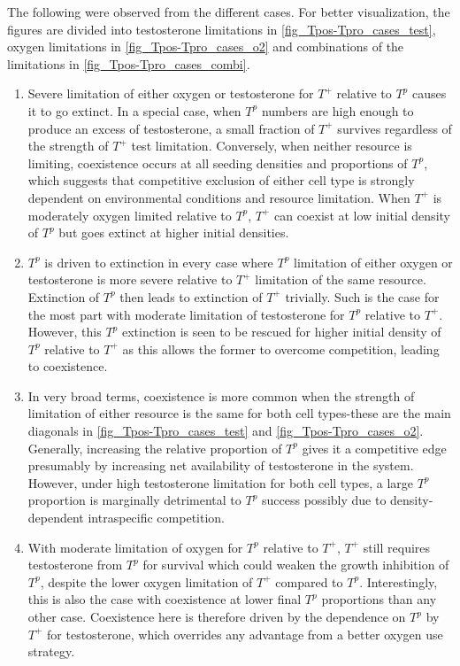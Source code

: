 The following were observed from the different cases. For better visualization, the figures are divided into testosterone limitations in \autoref{fig_Tpos-Tpro_cases_test}, oxygen limitations in \autoref{fig_Tpos-Tpro_cases_o2} and combinations of the limitations in \autoref{fig_Tpos-Tpro_cases_combi}.
\begin{enumerate}
  \item Severe limitation of either oxygen or testosterone for $T^+$ relative to $T^p$ causes it to go extinct. In a special case, when $T^p$ numbers are high enough to produce an excess of testosterone, a small fraction of $T^+$ survives regardless of the strength of $T^+$ test limitation. Conversely, when neither resource is limiting, coexistence occurs at all seeding densities and proportions of $T^p$, which suggests that competitive exclusion of either cell type is strongly dependent on environmental conditions and resource limitation. When $T^+$ is moderately oxygen limited relative to $T^p$, $T^+$ can coexist at low initial density of $T^p$ but goes extinct at higher initial densities.
  \item $T^p$ is driven to extinction in every case where $T^p$ limitation of either oxygen or testosterone is more severe relative to $T^+$ limitation of the same resource. Extinction of $T^p$ then leads to extinction of $T^+$ trivially. Such is the case for the most part with moderate limitation of testosterone for $T^p$ relative to $T^+$. However, this $T^p$ extinction is seen to be rescued for higher initial density of $T^p$ relative to $T^+$ as this allows the former to overcome competition, leading to coexistence.
  \item In very broad terms, coexistence is more common when the strength of limitation of either resource is the same for both cell types-these are the main diagonals in \autoref{fig_Tpos-Tpro_cases_test} and \autoref{fig_Tpos-Tpro_cases_o2}. Generally, increasing the relative proportion of $T^p$ gives it a competitive edge presumably by increasing net availability of testosterone in the system. However, under high testosterone limitation for both cell types, a large $T^p$ proportion is marginally detrimental to $T^p$ success possibly due to density-dependent intraspecific competition.
  \item With moderate limitation of oxygen for $T^p$ relative to $T^+$, $T^+$ still requires testosterone from $T^p$ for survival which could weaken the growth inhibition of $T^p$, despite the lower oxygen limitation of $T^+$ compared to $T^p$. Interestingly, this is also the case with coexistence at lower final $T^p$ proportions than any other case. Coexistence here is therefore driven by the dependence on $T^p$ by $T^+$ for testosterone, which overrides any advantage from a better oxygen use strategy.

\end{enumerate}
